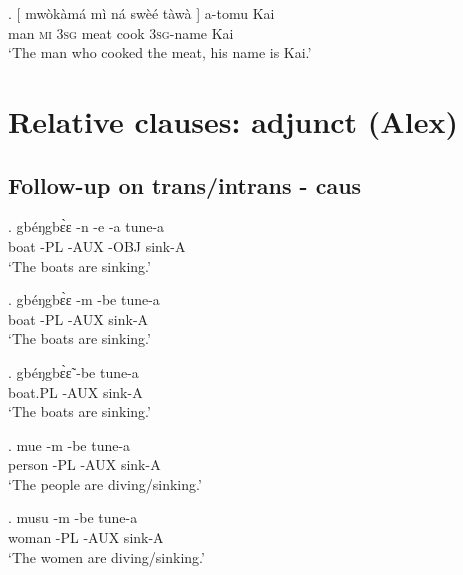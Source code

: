 \documentclass{assets/fieldnotes}
\begin{document}
{\exg. {[} mwòkàmá mì ná swèé tàwà {]} a-tomu Kai\\
{} man \textsc{mi} \textsc{3sg} meat cook {} \textsc{3sg}-name Kai\\
`The man who cooked the meat, his name is Kai.'\label{man_cook_meat_name_kai}

\noindent{\rule{\textwidth}{1pt}}



\section{Relative clauses: adjunct (Alex)} 


\subsection*{Follow-up on trans/intrans - caus}


\exg.
gbéŋgbɛ̀ɛ   -n    -e     -a     tune-a \\
boat       -PL   -AUX   -OBJ   sink-A \\
`The boats are sinking.' \label{The boats are sinking - obj marker}


\exg.
gbéŋgbɛ̀ɛ   -m    -be    tune-a \\
boat       -PL   -AUX   sink-A \\
`The boats are sinking.' \label{The boats are sinking - no obj marker}


\exg.
gbéŋgbɛ̀ɛ̃   -be    tune-a \\
boat.PL    -AUX   sink-A \\
`The boats are sinking.' \label{The boats are sinking - slow}

\exg.
mue     -m    -be    tune-a \\
person   -PL   -AUX   sink-A \\%
`The people are diving/sinking.'

\exg.
musu    -m    -be    tune-a \\
woman   -PL   -AUX   sink-A \\%
`The women are diving/sinking.' \label{The women are diving - no little v}

}
\end{document}
